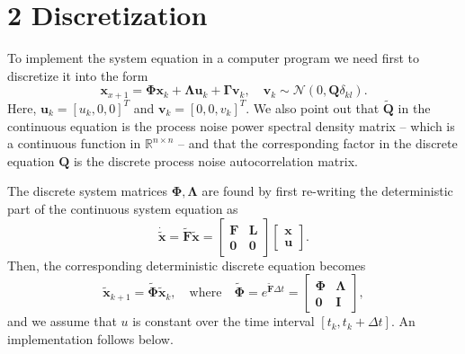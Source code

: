 \documentclass[11pt]{article}
\begin{document}
    \hypertarget{discretization}{%
\section*{2 Discretization}\label{discretization}}

    To implement the system equation in a computer program we need first to
discretize it into the form \[
\mathbf{x}_{x+1} = \mathbf{\Phi}\mathbf{x}_k + \mathbf{\Lambda}\mathbf{u}_k + \mathbf{\Gamma}\mathbf{v}_k, \quad \mathbf{v}_k \sim \mathcal{N}(0, \mathbf{Q} \delta_{kl}).
\] Here, \(\mathbf{u}_k = [u_k, 0, 0]^T\) and
\(\mathbf{v}_k = [0, 0, v_k]^T\). We also point out that
\(\tilde{\mathbf{Q}}\) in the continuous equation is the process noise
power spectral density matrix -- which is a continuous function in
\(\mathbb{R}^{n \times n}\) -- and that the corresponding factor in the
discrete equation \(\mathbf{Q}\) is the discrete process noise
autocorrelation matrix.

The discrete system matrices \(\mathbf{\Phi}, \mathbf{\Lambda}\) are
found by first re-writing the deterministic part of the continuous
system equation as \[
\dot{\tilde{\mathbf{x}}} = \tilde{\mathbf{F}}\tilde{\mathbf{x}} = 
\begin{bmatrix}
\mathbf{F} & \mathbf{L} \\
\mathbf{0} & \mathbf{0}
\end{bmatrix}
\begin{bmatrix}
\mathbf{x} \\
\mathbf{u}
\end{bmatrix}.
\] Then, the corresponding deterministic discrete equation becomes \[
\tilde{\mathbf{x}}_{k+1} = \tilde{\mathbf{\Phi}}\tilde{\mathbf{x}}_k, 
\quad \text{where} \quad 
\tilde{\mathbf{\Phi}} = e^{\tilde{\mathbf{F}} \Delta t} =
\begin{bmatrix}
\mathbf{\Phi} & \mathbf{\Lambda} \\
\mathbf{0} & \mathbf{I}
\end{bmatrix},
\] and we assume that \(u\) is constant over the time interval
\([t_k, t_k + \Delta t]\). An implementation follows below.
\end{document}
